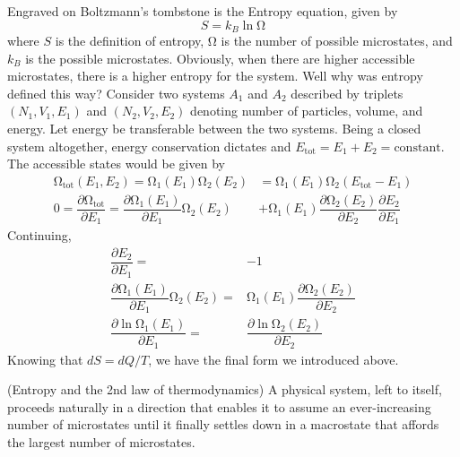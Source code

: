 \begin{defi}
Engraved on Boltzmann's tombstone is the Entropy equation, given by
\[S=k_{B}\ln \mathrm{\Omega }\]
where $S$ is the definition of entropy, $\mathrm{\Omega } $ is the number of possible microstates, and $k_{B}$ is the possible microstates. Obviously, when there are higher accessible microstates, there is a higher entropy for the system. Well why was entropy defined this way? Consider two systems $A_1$ and $A_2$ described by triplets $(N_{1},V_{1},E_{1})$ and $(N_{2},V_{2},E_{2})$ denoting number of particles, volume, and energy. Let energy be transferable between the two systems. Being a closed system altogether, energy conservation dictates and $E_{\mathrm{tot}}=E_1+E_2=\mathrm{constant}$. The accessible states would be given by
\begin{align*}
	\mathrm{\Omega }_{\mathrm{tot}}(E_1,E_2)=\mathrm{\Omega}_{1}(E_{1})\mathrm{\Omega}_{2}(E_2)&=\mathrm{\Omega }_{1}(E_{1})\mathrm{\Omega }_{2}(E_{\mathrm{tot}}-E_{1})\\
	0=\dfrac{\partial \mathrm{\Omega}  _{\mathrm{tot}}}{\partial E_{1}}=\dfrac{\partial \mathrm{\mathrm{\Omega} }_1(E_1)}{\partial E_1}\mathrm{\Omega} _2(E_2)&+\mathrm{\Omega} _1(E_1)\dfrac{\partial \mathrm{\Omega} _2(E_2)}{\partial E_2}\dfrac{\partial E_2}{\partial E_1}
\end{align*}
Continuing,
\begin{align*}
	\dfrac{\partial E_2}{\partial E_1}=&-1\\
	\dfrac{\partial \mathrm{\Omega} _1(E_1)}{\partial E_1}\mathrm{\Omega} _2(E_2)=&\mathrm{\Omega} _1(E_1)\dfrac{\partial \mathrm{\Omega} _2(E_2)}{\partial E_2}\\  
	\dfrac{\partial \ln\mathrm{\Omega} _1(E_1)}{\partial E_1}=&\dfrac{\partial \ln\mathrm{\Omega} _2(E_2)}{\partial E_2}  
\end{align*}
Knowing that $dS=dQ/T$, we have the final form we introduced above.
\end{defi}
\vspace{2ex}
\begin{thm}
	(Entropy and the 2nd law of thermodynamics) A physical system, left to itself, proceeds naturally in a direction that enables it to assume an ever-increasing number of microstates until it finally settles down in a macrostate that affords the largest number of microstates.
\end{thm}
\vspace{2ex}
